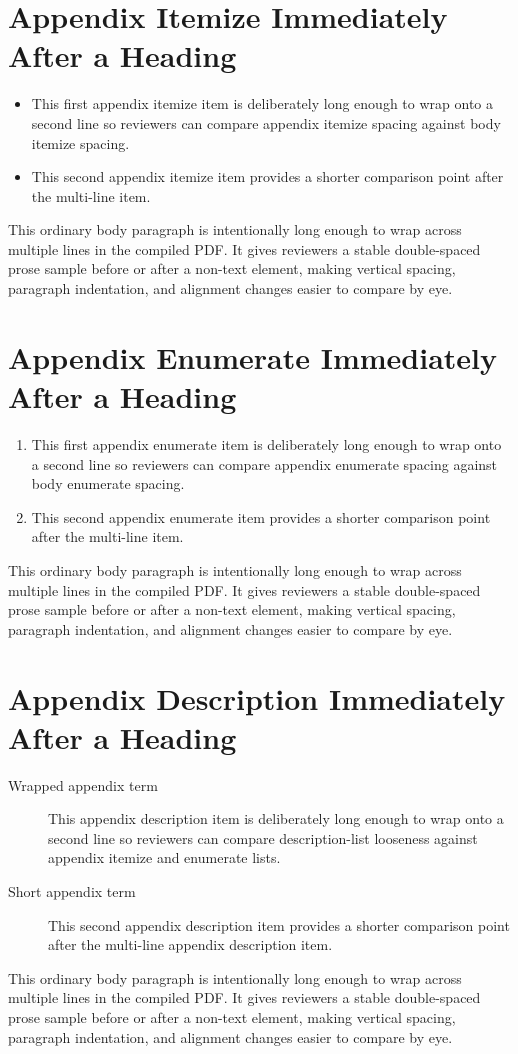 \documentclass{ndsudisq}
\newcommand{\spacingfiller}{This ordinary body paragraph is intentionally long enough to wrap across multiple lines in the compiled PDF. It gives reviewers a stable double-spaced prose sample before or after a non-text element, making vertical spacing, paragraph indentation, and alignment changes easier to compare by eye.}
\begin{document}
\section{Appendix Itemize Immediately After a Heading}
\begin{itemize}
  \item This first appendix itemize item is deliberately long enough to wrap onto a second line so reviewers can compare appendix itemize spacing against body itemize spacing.
  \item This second appendix itemize item provides a shorter comparison point after the multi-line item.
\end{itemize}

\spacingfiller

\section{Appendix Enumerate Immediately After a Heading}
\begin{enumerate}
  \item This first appendix enumerate item is deliberately long enough to wrap onto a second line so reviewers can compare appendix enumerate spacing against body enumerate spacing.
  \item This second appendix enumerate item provides a shorter comparison point after the multi-line item.
\end{enumerate}

\spacingfiller

\section{Appendix Description Immediately After a Heading}
\begin{description}
  \item[Wrapped appendix term] This appendix description item is deliberately long enough to wrap onto a second line so reviewers can compare description-list looseness against appendix itemize and enumerate lists.
  \item[Short appendix term] This second appendix description item provides a shorter comparison point after the multi-line appendix description item.
\end{description}

\spacingfiller
\end{document}
